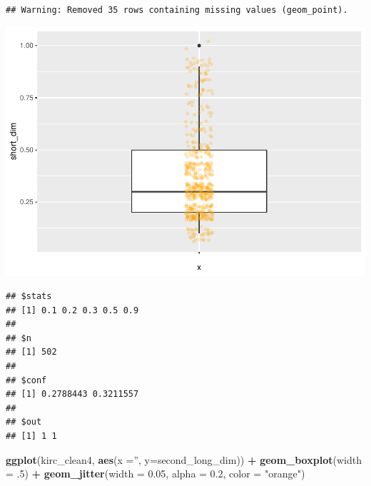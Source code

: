 \documentclass[]{article}
\newenvironment{Shaded}{\begin{snugshade}}{\end{snugshade}}
\newcommand{\KeywordTok}[1]{\textcolor[rgb]{0.13,0.29,0.53}{\textbf{#1}}}
\newcommand{\DataTypeTok}[1]{\textcolor[rgb]{0.13,0.29,0.53}{#1}}
\newcommand{\DecValTok}[1]{\textcolor[rgb]{0.00,0.00,0.81}{#1}}
\newcommand{\FloatTok}[1]{\textcolor[rgb]{0.00,0.00,0.81}{#1}}
\newcommand{\StringTok}[1]{\textcolor[rgb]{0.31,0.60,0.02}{#1}}
\newcommand{\OperatorTok}[1]{\textcolor[rgb]{0.81,0.36,0.00}{\textbf{#1}}}
\newcommand{\NormalTok}[1]{#1}
\begin{document}
\begin{verbatim}
## Warning: Removed 35 rows containing missing values (geom_point).
\end{verbatim}

\includegraphics{figs/render-unnamed-chunk-25-1.pdf}

\begin{Shaded}
\end{Shaded}

\begin{verbatim}
## $stats
## [1] 0.1 0.2 0.3 0.5 0.9
## 
## $n
## [1] 502
## 
## $conf
## [1] 0.2788443 0.3211557
## 
## $out
## [1] 1 1
\end{verbatim}

\begin{Shaded}
\begin{Highlighting}[]
\KeywordTok{ggplot}\NormalTok{(kirc_clean4, }\KeywordTok{aes}\NormalTok{(}\DataTypeTok{x =}\StringTok{''}\NormalTok{, }\DataTypeTok{y=}\NormalTok{second_long_dim)) }\OperatorTok{+}
\StringTok{     }\KeywordTok{geom_boxplot}\NormalTok{(}\DataTypeTok{width =}\NormalTok{ .}\DecValTok{5}\NormalTok{) }\OperatorTok{+}
\StringTok{     }\KeywordTok{geom_jitter}\NormalTok{(}\DataTypeTok{width =} \FloatTok{0.05}\NormalTok{, }\DataTypeTok{alpha =} \FloatTok{0.2}\NormalTok{, }\DataTypeTok{color =} \StringTok{"orange"}\NormalTok{)}
\end{Highlighting}
\end{Shaded}
\end{document}
